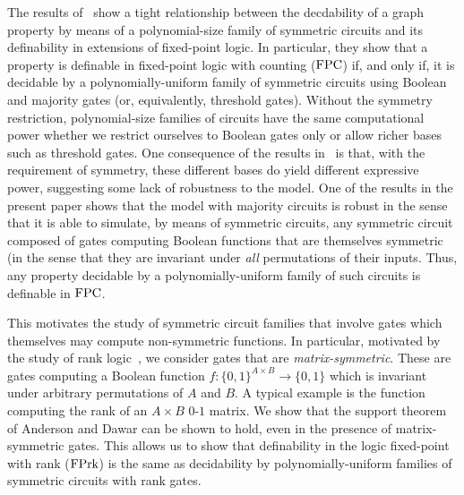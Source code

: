 \documentclass[12pt]{report}
\newcommand{\logic}[1]{\text{\upshape #1}\xspace}
\newcommand{\FPC}{\logic{FPC}}
\newcommand{\FPR}{\logic{FPrk}}
\newcommand{\CPTC}{\logic{$\tilde{\text C}$PT(Card)}}
\begin{document}
The results of~\cite{AndersonD17} show a tight relationship between the decdability of
a graph property by means of a polynomial-size family of symmetric circuits and
its definability in extensions of fixed-point logic. In particular, they show
that a property is definable in fixed-point logic with counting ($\FPC$) if, and
only if, it is decidable by a polynomially-uniform family of symmetric circuits
using Boolean and majority gates (or, equivalently, threshold gates). Without
the symmetry restriction, polynomial-size families of circuits have the same
computational power whether we restrict ourselves to Boolean gates only or allow
richer bases such as threshold gates. One consequence of the results
in~\cite{AD14} is that, with the requirement of symmetry, these different bases
do yield different expressive power, suggesting some lack of robustness to the
model. One of the results in the present paper shows that the model with
majority circuits is robust in the sense that it is able to simulate, by means
of symmetric circuits, any symmetric circuit composed of gates computing Boolean
functions that are themselves symmetric (in the sense that they are invariant
under \emph{all} permutations of their inputs. Thus, any property decidable by a
polynomially-uniform family of such circuits is definable in $\FPC$.

This motivates the study of symmetric circuit families that involve gates which
themselves may compute non-symmetric functions. In particular, motivated by the
study of rank logic~\cite{DGHL09,GP15}, we consider gates that are
\emph{matrix-symmetric}. These are gates computing a Boolean function $f:
\{0,1\}^{A \times B} \rightarrow \{0,1\}$ which is invariant under arbitrary
permutations of $A$ and $B$. A typical example is the function computing the
rank of an $A \times B$ $0$-$1$ matrix. We show that the support theorem of
Anderson and Dawar can be shown to hold, even in the presence of
matrix-symmetric gates. This allows us to show that definability in the logic
fixed-point with rank ($\FPR$) is the same as decidability by
polynomially-uniform families of symmetric circuits with rank gates.

\end{document}
